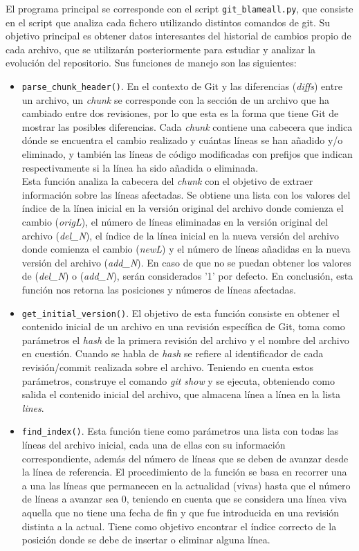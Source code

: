 \documentclass[a4paper, 12pt]{book}
\begin{document}
El programa principal se corresponde con el script \texttt{git\_blameall.py}, que consiste en el script que analiza cada fichero utilizando distintos comandos de git. Su objetivo principal es obtener datos interesantes del historial de cambios propio de cada archivo, que se utilizarán posteriormente para estudiar y 
analizar la evolución del repositorio. Sus funciones de manejo son las siguientes:
\begin{itemize}
  \item \texttt{parse\_chunk\_header()}. En el contexto de Git y las diferencias (\textit{diffs}) entre un archivo, un \textit{chunk} se corresponde con la sección de un archivo que ha cambiado entre dos revisiones, por lo que esta es la forma que tiene Git de mostrar las posibles diferencias. Cada \textit{chunk} 
  contiene una cabecera que indica dónde se encuentra el cambio realizado y cuántas líneas se han añadido y/o eliminado, y también las líneas de código modificadas con prefijos que indican respectivamente si la línea ha sido añadida o eliminada.
  \\Esta función analiza la cabecera del \textit{chunk} con el objetivo de extraer información sobre las líneas afectadas. Se obtiene una lista con los valores del índice de la línea inicial en la versión original del archivo donde comienza el cambio (\textit{origL}), el número de líneas eliminadas en la versión original
  del archivo (\textit{del\_N}), el índice de la línea inicial en la nueva versión del archivo donde comienza el cambio (\textit{newL}) y el número de líneas añadidas en la nueva versión del archivo (\textit{add\_N}). En caso de que no se puedan obtener los valores de (\textit{del\_N}) o (\textit{add\_N}), serán
  considerados '1' por defecto. En conclusión, esta función nos retorna las posiciones y números de líneas afectadas.
  
  \item \texttt{get\_initial\_version()}. El objetivo de esta función consiste en obtener el contenido inicial de un archivo en una revisión específica de Git, toma como parámetros el \textit{hash} de la primera revisión del archivo y el nombre del archivo en cuestión. Cuando se habla de \textit{hash} se refiere al identificador
  de cada revisión/commit realizada sobre el archivo. Teniendo en cuenta estos parámetros, construye el comando \textit{git show} y se ejecuta, obteniendo como salida el contenido inicial del archivo, que almacena línea a línea en la lista \textit{lines}.

  \item \texttt{find\_index()}. Esta función tiene como parámetros una lista con todas las líneas del archivo inicial, cada una de ellas con su información correspondiente, además del número de líneas que se deben de avanzar desde la línea de referencia. El procedimiento de la función se basa en recorrer una a una las líneas que
  permanecen en la actualidad (vivas) hasta que el número de líneas a avanzar sea 0, teniendo en cuenta que se considera una línea viva aquella que no tiene una fecha de fin y que fue introducida en una revisión distinta a la actual. Tiene como objetivo encontrar el índice correcto de la posición donde se debe de insertar o eliminar
  alguna línea.
    

\end{itemize}
\end{document}
